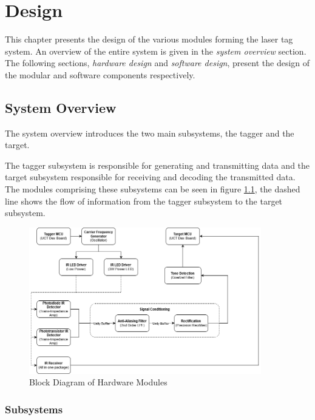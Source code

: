 \chapter{Design}
\label{ch_design}

This chapter presents the design of the various modules forming the laser tag system. An overview of the entire system is given in the \textit{system overview} section. The following sections, \textit{hardware design} and \textit{software design}, present the design of the modular and software components respectively.


\section{System Overview}
The system overview introduces the two main subsystems, the tagger and the target.

The tagger subsystem is responsible for generating and transmitting data and the target subsystem responsible for receiving and decoding the transmitted data. The modules comprising these subsystems can be seen in figure \ref{fig:system_overview_hardware}, the dashed line shows the flow of information from the tagger subsystem to the target subsystem.

\begin{figure}[H]
	\centering
	\includegraphics[width=0.9\textwidth]{figures/design/system_overview_hardware}
	\caption{Block Diagram of Hardware Modules}
	\label{fig:system_overview_hardware}
\end{figure}

\subsection{Subsystems}

